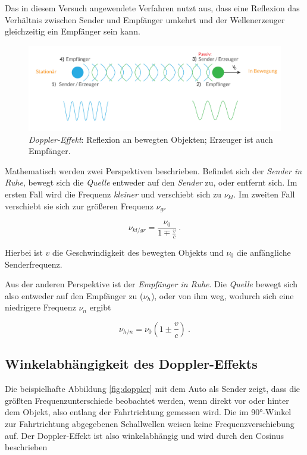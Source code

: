 Das in diesem Versuch angewendete Verfahren nutzt aus, dass eine Reflexion das Verhältnis zwischen Sender und Empfänger umkehrt und der Wellenerzeuger gleichzeitig ein Empfänger sein kann.

\begin{figure}
    \centering
    \includegraphics[width=.95\textwidth]{media/doppler_SE.pdf}
    \caption{\textit{Doppler-Effekt}: Reflexion an bewegten Objekten; Erzeuger ist auch Empfänger.}
    \label{fig:se}
\end{figure}

Mathematisch werden zwei Perspektiven beschrieben. Befindet sich der \textit{Sender in Ruhe}, bewegt sich die \textit{Quelle} entweder auf den \textit{Sender} zu, oder entfernt sich.
Im ersten Fall wird die Frequenz \textit{kleiner} und verschiebt sich zu $\nu_{kl}$. Im zweiten Fall verschiebt sie sich zur größeren Frequenz $\nu_{gr}$

\begin{equation*}
    \nu_{kl/gr} = \frac{\nu_0}{1 \mp \frac{v}{c}} \:.
\end{equation*}

Hierbei ist $v$ die Geschwindigkeit des bewegten Objekts und $\nu_0$ die anfängliche Senderfrequenz.

Aus der anderen Perspektive ist der \textit{Empfänger in Ruhe}. Die \textit{Quelle} bewegt sich also entweder auf den Empfänger zu ($\nu_h$), oder von ihm weg, wodurch sich eine niedrigere
Frequenz $\nu_n$ ergibt

\begin{equation*}
    \nu_{h/n} = \nu_0 (1 \pm \frac{v}{c}) \:.
\end{equation*}

\subsection{Winkelabhängigkeit des Doppler-Effekts}
Die beispielhafte Abbildung \ref{fig:doppler} mit dem Auto als Sender zeigt, dass die größten Frequenzunterschiede beobachtet werden, wenn direkt vor oder hinter dem Objekt,
also entlang der Fahrtrichtung gemessen wird. Die im 90°-Winkel zur Fahrtrichtung abgegebenen Schallwellen weisen keine Frequenzverschiebung auf. Der Doppler-Effekt ist also winkelabhängig und wird
durch den Cosinus beschrieben

